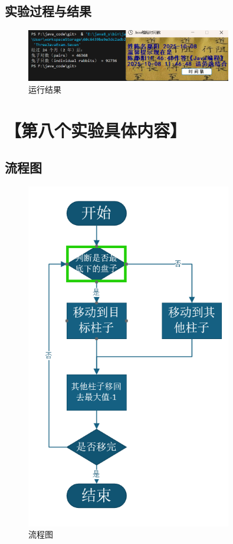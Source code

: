 \documentclass[12pt,a4paper]{article}
\begin{document}
\subsection*{实验过程与结果}

\begin{figure}[H]
\centering
\includegraphics[width=0.8\textwidth]{seven.png}
\caption{运行结果}
\end{figure}
\section*{【第八个实验具体内容】}
\subsection*{流程图}

\begin{figure}[H]
\centering
\includegraphics[width=0.8\textwidth]{eight1.png}
\caption{流程图}
\end{figure}
\end{document}
